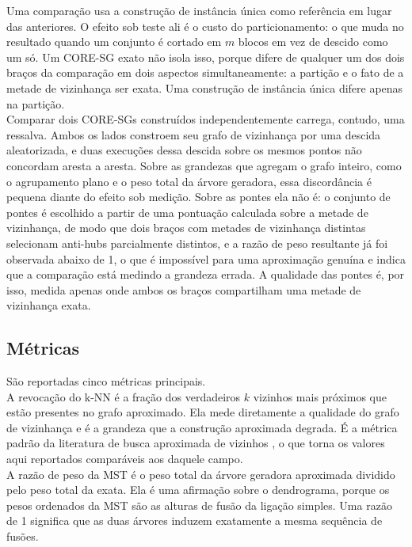 Uma comparação usa a construção de instância única como referência em lugar das anteriores. O efeito sob teste ali é o custo do particionamento: o que muda no resultado quando um conjunto é cortado em $m$ blocos em vez de descido como um só. Um \ac{CORE-SG} exato não isola isso, porque difere de qualquer um dos dois braços da comparação em dois aspectos simultaneamente: a partição e o fato de a metade de vizinhança ser exata. Uma construção de instância única difere apenas na partição.\\

Comparar dois \ac{CORE-SG}s construídos independentemente carrega, contudo, uma ressalva. Ambos os lados constroem seu grafo de vizinhança por uma descida aleatorizada, e duas execuções dessa descida sobre os mesmos pontos não concordam aresta a aresta. Sobre as grandezas que agregam o grafo inteiro, como o agrupamento plano e o peso total da árvore geradora, essa discordância é pequena diante do efeito sob medição. Sobre as pontes ela não é: o conjunto de pontes é escolhido a partir de uma pontuação calculada sobre a metade de vizinhança, de modo que dois braços com metades de vizinhança distintas selecionam anti-hubs parcialmente distintos, e a razão de peso resultante já foi observada abaixo de 1, o que é impossível para uma aproximação genuína e indica que a comparação está medindo a grandeza errada. A qualidade das pontes é, por isso, medida apenas onde ambos os braços compartilham uma metade de vizinhança exata.\\

\subsection{Métricas\label{sec:metrics}}

São reportadas cinco métricas principais.\\

A revocação do \ac{k-NN} é a fração dos verdadeiros $k$ vizinhos mais próximos que estão presentes no grafo aproximado. Ela mede diretamente a qualidade do grafo de vizinhança e é a grandeza que a construção aproximada degrada. É a métrica padrão da literatura de busca aproximada de vizinhos \cite{annbench}, o que torna os valores aqui reportados comparáveis aos daquele campo.\\

A razão de peso da \ac{MST} é o peso total da árvore geradora aproximada dividido pelo peso total da exata. Ela é uma afirmação sobre o dendrograma, porque os pesos ordenados da \ac{MST} são as alturas de fusão da ligação simples. Uma razão de 1 significa que as duas árvores induzem exatamente a mesma sequência de fusões.\\

